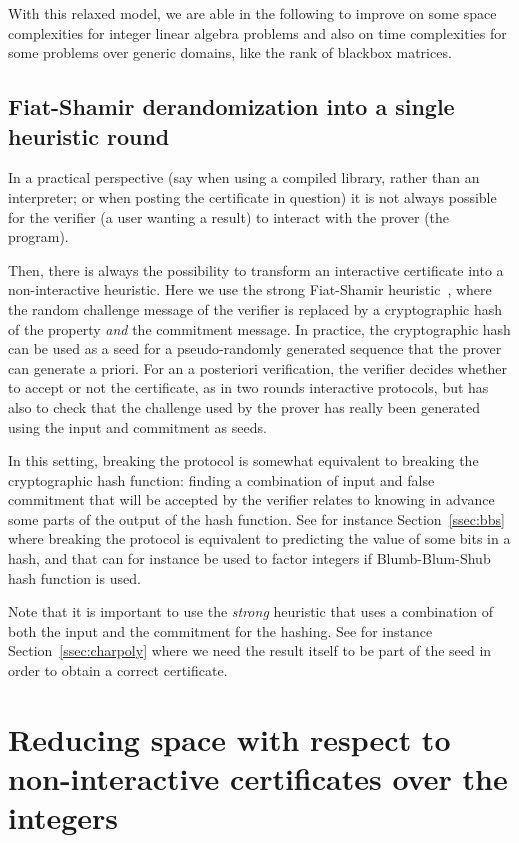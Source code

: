 \documentclass{article}
\newcommand{\customlinebreak}{}
\begin{document}
With this relaxed model, we are able in the following to improve on
some space complexities for integer linear algebra problems and also
on time complexities for some problems over generic domains, like the rank of
blackbox matrices.

 
 
 
\subsection{Fiat-Shamir derandomization into a single
  heuristic round}\label{ssec:fiatshamir}
In a practical perspective (say when using a compiled library, rather than an
interpreter; or when posting the certificate in question) it is not always
possible for the verifier (a user wanting a result) to interact with the prover
(the program). 

Then, there is always the possibility to transform an interactive certificate
into a non-interactive heuristic. 
Here we use the strong Fiat-Shamir
heuristic~\cite{Fiat:1986:Shamir,Bellare:1993:randomoracle,Bernhard:2012:fiatshamir},
where the random challenge message of the verifier is replaced by a
cryptographic hash of the property {\em and} the commitment message.
In practice, the cryptographic hash can be used as a seed for a pseudo-randomly
generated sequence that the prover can generate a priori. 
For an a posteriori verification, the verifier decides whether to accept or not
the certificate, as in two rounds interactive protocols, but has also to check
that the challenge used by the prover has really been generated using the input
and commitment as seeds.

In this setting, breaking the protocol is somewhat equivalent to breaking the
cryptographic hash function: finding a combination of input and false commitment
that will be accepted by the verifier relates to knowing in advance some parts
of the output of the hash function.
See for instance Section~\ref{ssec:bbs} where
breaking the protocol is equivalent to predicting the value of some bits in a
hash, and that can for instance be used to factor integers if Blumb-Blum-Shub
hash function is used. 

Note that it is important to use the {\em strong} heuristic that uses a
combination of both the input and the commitment for the hashing.
See for instance Section~\ref{ssec:charpoly} where we need the result itself to
be part of the seed in order to obtain a correct certificate.

 
 
\section{Reducing space with respect to non-interactive certificates{\customlinebreak} over the
  integers}\label{sec:ints}
\end{document}
